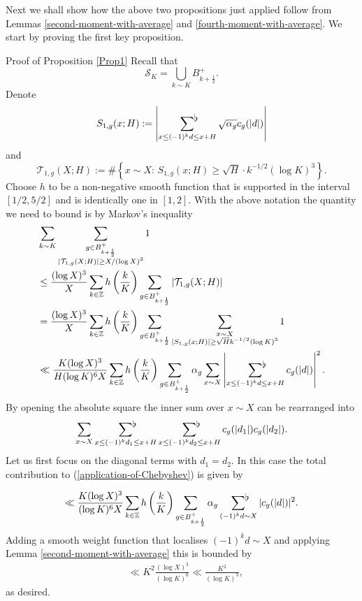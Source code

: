 \documentclass[a4paper,10pt,twoside]{amsart}
\theoremstyle{definition}
\numberwithin{equation}{section}
\newcommand\Z{\mathbb{Z}}
\renewcommand\:{\colon}
\newcommand{\sumflat}{\mathop{{\sum}^{\raisebox{-3pt}{\makebox[0pt][l]{$\flat$}}}}}
\begin{document}
\noindent Next we shall show how the above two propositions just applied follow from Lemmas \ref{second-moment-with-average} and \ref{fourth-moment-with-average}. We start by proving the first key proposition.

\begin{subsection}{Proof of Proposition \ref{Prop1}}
Recall that
\[\mathcal S_K=\bigcup_{k\sim K}B_{k+\frac12}^+.\]
Denote
\[S_{1,g}(x;H):=\left|\sumflat_{x\leq (-1)^kd\leq x+H}\sqrt{\alpha_g}c_g(|d|)\right|\]
and 
\[\mathcal T_{1,g}(X;H):=\#\left\{x\sim X:\,S_{1,g}(x;H)\geq \sqrt H \cdot k^{-1/2}(\log K)^3\right\}.\]
Choose $h$ to be a non-negative smooth function that is supported in the interval $[1/2,5/2]$ and is identically one in $[1,2]$. With the above notation the quantity we need to bound is by Markov's inequality
\begin{align}\label{application-of-Chebyshev}
&\sum_{k\sim K}\sum_{\substack{g\in B_{k+\frac12}^+\\|\mathcal T_{1,g}(X;H)|\geq X/(\log X)^3}} 1 \nonumber\\
&\leq\frac{(\log X)^3}{X}\sum_{k\in\Z}h\left(\frac{k}K\right)\sum_{g\in B_{k+\frac12}^+}|\mathcal T_{1,g}(X;H)| \nonumber\\
&=\frac{(\log X)^3}{X}\sum_{k\in\Z}h\left(\frac{k}K\right)\sum_{g\in B_{k+\frac12}^+}\sum_{\substack{x\sim X\\
|S_{1,g}(x;H)|\geq \sqrt H k^{-1/2}(\log K)^3}}1 \nonumber \\
&\ll \frac {K(\log X)^3}{H(\log K)^6X}\sum_{k\in\Z}h\left(\frac{k}K\right)\sum_{g\in B_{k+\frac12}^+}\alpha_g\sum_{x\sim X}\left|\sumflat_{x\leq (-1)^kd\leq x+H}c_g(|d|)\right|^2. 
\end{align}
By opening the absolute square the inner sum over $x\sim X$ can be rearranged into
\[ 
\sum_{x\sim X}\sumflat_{x\leq(-1)^kd_1\leq x+H}\sumflat_{x\leq(-1)^kd_2\leq x+H}c_g(|d_1|)c_g(|d_2|).\]
Let us first focus on the diagonal terms with $d_1=d_2$. In this case the total contribution to (\ref{application-of-Chebyshev}) is given by

\[\ll \frac {K(\log X)^3}{(\log K)^6X}\sum_{k\in\Z}h\left(\frac{k}K\right)\sum_{g\in B_{k+\frac12}^+}\alpha_g\sumflat_{(-1)^kd\sim X}|c_g(|d|)|^2.\]
Adding a smooth weight function that localises $(-1)^kd\sim X$ and applying Lemma \ref{second-moment-with-average} this is bounded by
\begin{align*}
&\ll K^2\frac {(\log X)^3}{(\log K)^6}\ll \frac{K^2}{(\log K)^3}, 
\end{align*}
as desired.   


\end{subsection}
\end{document}
